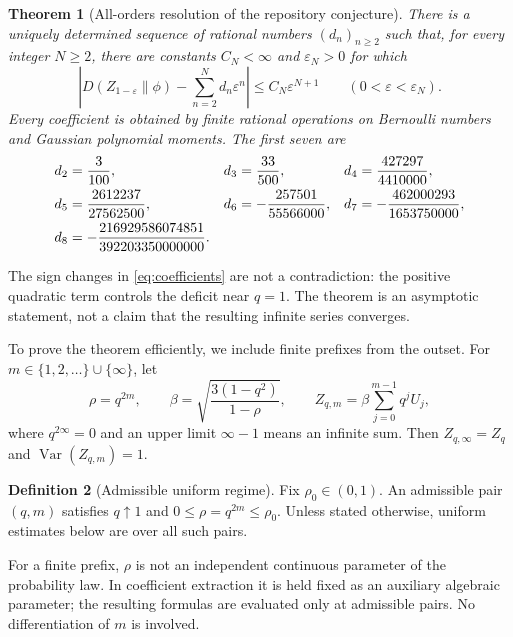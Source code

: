 \documentclass[11pt,a4paper]{article}
\numberwithin{equation}{section}
\newtheorem{theorem}{Theorem}[section]
\theoremstyle{definition}
\newtheorem{definition}[theorem]{Definition}
\theoremstyle{remark}
\newcommand{\eps}{\varepsilon}
\newcommand{\Var}{\operatorname{Var}}
\begin{document}
\begin{theorem}[All-orders resolution of the repository conjecture]
\label{thm:main}
There is a uniquely determined sequence of rational numbers $(d_n)_{n\ge2}$
such that, for every integer $N\ge2$, there are constants $C_N<\infty$ and
$\eps_N>0$ for which
\begin{equation}
 \left|D(Z_{1-\eps}\|\phi)-\sum_{n=2}^{N}d_n\eps^n\right|
 \le C_N\eps^{N+1}
 \qquad(0<\eps<\eps_N).
 \label{eq:main-estimate}
\end{equation}
Every coefficient is obtained by finite rational operations on Bernoulli
numbers and Gaussian polynomial moments. The first seven are
\begin{align}
 d_2&=\frac3{100},&
 d_3&=\frac{33}{500},&
 d_4&=\frac{427297}{4410000},\notag\\
 d_5&=\frac{2612237}{27562500},&
 d_6&=-\frac{257501}{55566000},&
 d_7&=-\frac{462000293}{1653750000},\notag\\
 d_8&=-\frac{216929586074851}{392203350000000}.
 \label{eq:coefficients}
\end{align}
\end{theorem}

The sign changes in \eqref{eq:coefficients} are not a contradiction: the positive
quadratic term controls the deficit near $q=1$. The theorem is an asymptotic
statement, not a claim that the resulting infinite series converges.

To prove the theorem efficiently, we include finite prefixes from the outset.
For $m\in\{1,2,\ldots\}\cup\{\infty\}$, let
\begin{equation}
 \rho=q^{2m},\qquad
 \beta=\sqrt{\frac{3(1-q^2)}{1-\rho}},\qquad
 Z_{q,m}=\beta\sum_{j=0}^{m-1}q^jU_j,
 \label{eq:finite-law}
\end{equation}
where $q^{2\infty}=0$ and an upper limit $\infty-1$ means an infinite sum.
Then $Z_{q,\infty}=Z_q$ and $\Var(Z_{q,m})=1$.

\begin{definition}[Admissible uniform regime]
Fix $\rho_0\in(0,1)$. An admissible pair $(q,m)$ satisfies
$q\uparrow1$ and $0\le\rho=q^{2m}\le\rho_0$.
Unless stated otherwise, uniform estimates below are over all such pairs.
\end{definition}

For a finite prefix, $\rho$ is not an independent continuous parameter of the
probability law. In coefficient extraction it is held fixed as an auxiliary
algebraic parameter; the resulting formulas are evaluated only at admissible
pairs. No differentiation of $m$ is involved.
\end{document}
